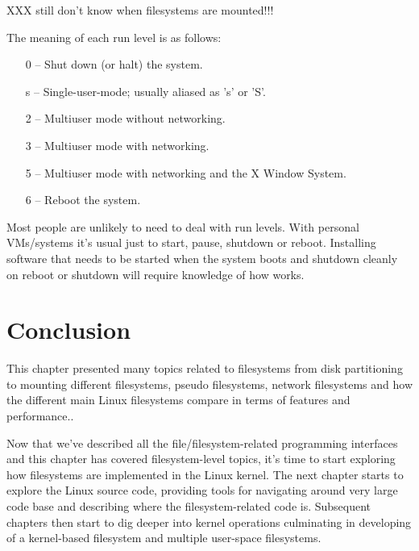 XXX still don't know when filesystems are mounted!!!

The meaning of each run level is as follows:

\begin{itemize}
	\item [0] -- Shut down (or halt) the system.
	\item [s] -- Single-user-mode; usually aliased as 's' or 'S'.
	\item [2] -- Multiuser mode without networking.
	\item [3] -- Multiuser mode with networking.
	\item [5] -- Multiuser mode with networking and the X Window System.
	\item [6] -- Reboot the system.
\end{itemize}

\noindent
Most people are unlikely to need to deal with run levels. With personal VMs/systems it's usual just to start, pause, shutdown or reboot. Installing software that needs to be started when the system boots and shutdown cleanly on reboot or shutdown will require knowledge of how  works. 


\section{Conclusion}

This chapter presented many topics related to filesystems from disk partitioning to mounting different filesystems, pseudo filesystems, network filesystems and how the different main Linux filesystems compare in terms of features and performance.. 

Now that we've described all the file/filesystem-related programming interfaces and this chapter has covered filesystem-level topics, it's time to start exploring how filesystems are implemented in the Linux kernel. The next chapter starts to explore the Linux source code, providing tools for navigating around very large code base and describing where the filesystem-related code is. Subsequent chapters then start to dig deeper into kernel operations culminating in developing of a kernel-based filesystem and multiple user-space filesystems.

